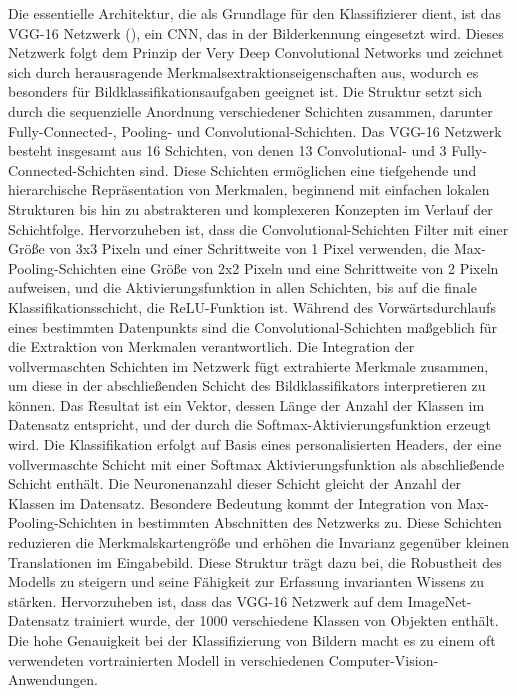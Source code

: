 Die essentielle Architektur, die als Grundlage für den Klassifizierer dient, ist das VGG-16 Netzwerk (\cite{simonyan_very_2015}), ein CNN, das in der Bilderkennung eingesetzt wird. Dieses Netzwerk folgt dem Prinzip der \glqq Very Deep Convolutional Networks\grqq{} und zeichnet sich durch herausragende Merkmalsextraktionseigenschaften aus, wodurch es besonders für Bildklassifikationsaufgaben geeignet ist. Die Struktur setzt sich durch die sequenzielle Anordnung verschiedener Schichten zusammen, darunter Fully-Connected-, Pooling- und Convolutional-Schichten.
Das VGG-16 Netzwerk besteht insgesamt aus 16 Schichten, von denen 13 Convolutional- und 3 Fully-Connected-Schichten sind. Diese Schichten ermöglichen eine tiefgehende und hierarchische Repräsentation von Merkmalen, beginnend mit einfachen lokalen Strukturen bis hin zu abstrakteren und komplexeren Konzepten im Verlauf der Schichtfolge. Hervorzuheben ist, dass die Convolutional-Schichten Filter mit einer Größe von 3x3 Pixeln und einer Schrittweite von 1 Pixel verwenden, die Max-Pooling-Schichten eine Größe von 2x2 Pixeln und eine Schrittweite von 2 Pixeln aufweisen, und die Aktivierungsfunktion in allen Schichten, bis auf die finale Klassifikationsschicht, die ReLU-Funktion ist. Während des Vorwärtsdurchlaufs eines bestimmten Datenpunkts sind die Convolutional-Schichten maßgeblich für die Extraktion von Merkmalen verantwortlich.
Die Integration der vollvermaschten Schichten im Netzwerk fügt extrahierte Merkmale zusammen, um diese in der abschließenden Schicht des Bildklassifikators interpretieren zu können. Das Resultat ist ein Vektor, dessen Länge der Anzahl der Klassen im Datensatz entspricht, und der durch die Softmax-Aktivierungsfunktion erzeugt wird. Die Klassifikation erfolgt auf Basis eines personalisierten Headers, der eine vollvermaschte Schicht mit einer Softmax Aktivierungsfunktion als abschließende Schicht enthält. Die Neuronenanzahl dieser Schicht gleicht der Anzahl der Klassen im Datensatz.
Besondere Bedeutung kommt der Integration von Max-Pooling-Schichten in bestimmten Abschnitten des Netzwerks zu. Diese Schichten reduzieren die Merkmalskartengröße und erhöhen die Invarianz gegenüber kleinen Translationen im Eingabebild. Diese Struktur trägt dazu bei, die Robustheit des Modells zu steigern und seine Fähigkeit zur Erfassung invarianten Wissens zu stärken.
Hervorzuheben ist, dass das VGG-16 Netzwerk auf dem ImageNet-Datensatz trainiert wurde, der 1000 verschiedene Klassen von Objekten enthält. Die hohe Genauigkeit bei der Klassifizierung von Bildern macht es zu einem oft verwendeten vortrainierten Modell in verschiedenen Computer-Vision-Anwendungen. 

